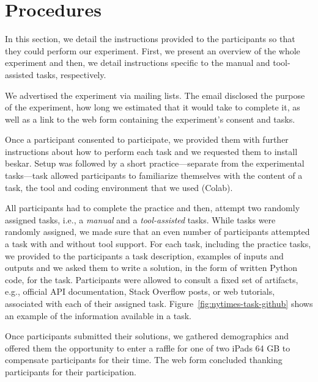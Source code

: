 
\section{Procedures}
\label{cp6:procedures}





In this section, we detail the instructions provided to the participants so that 
they could perform our experiment. 
First, we present an overview of the whole experiment and then, we detail
instructions specific to the manual and tool-assisted tasks, respectively.



We advertised the experiment via mailing lists. The email disclosed the purpose of the experiment, how long we estimated that it would take to complete it, as well as a link 
to the web form containing the experiment's consent and tasks. 




Once a participant consented to participate, we provided them with further instructions 
about how to perform each task and we requested them to install \acs{beskar}.
Setup was followed by a short practice---separate from the experimental tasks---task allowed participants to familiarize themselves with the content of a task, the tool and coding environment that we used (Colab). 



All participants had to complete the practice and then, attempt two randomly assigned tasks, i.e., a \textit{manual} and a \textit{tool-assisted} tasks. While tasks were randomly assigned, we made sure that an even number of participants attempted a task with and without tool support.
For each task, including the practice tasks, we provided to the participants a task description, examples of inputs and outputs and we asked them to write a solution, in the form of written Python code, for the task. 
Participants were allowed to consult a fixed set of artifacts, e.g., official API documentation, Stack Overflow posts, or web tutorials, 
associated with each of their assigned task. 
Figure~\ref{fig:nytimes-task-github}
shows an example of the information available in a task.


Once participants submitted their solutions, we gathered demographics and offered them the opportunity to enter a raffle for one of two iPads 64 GB 
to compensate participants for their time.
The web form concluded thanking participants for their participation.



